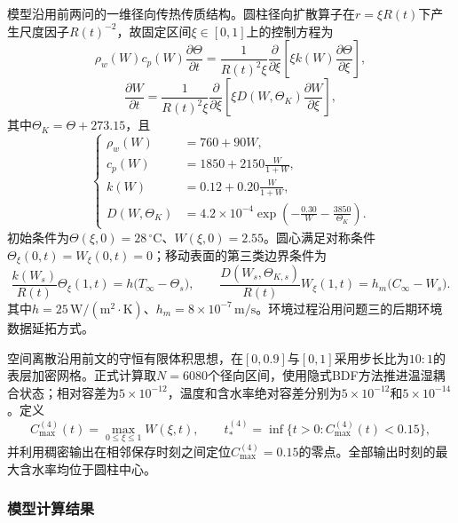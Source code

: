 \documentclass[withoutpreface,bwprint]{cumcmthesis}
\begin{document}
模型沿用前两问的一维径向传热传质结构。圆柱径向扩散算子在$r=\xi R(t)$下产生尺度因子$R(t)^{-2}$，故固定区间$\xi\in[0,1]$上的控制方程为
\begin{equation}
\boxed{
\rho_w(W)c_p(W)\frac{\partial\Theta}{\partial t}
=\frac{1}{R(t)^2\xi}
\frac{\partial}{\partial\xi}
\left[\xi k(W)\frac{\partial\Theta}{\partial\xi}\right],
}
\label{eq:q4-main-heat}
\end{equation}
\begin{equation}
\boxed{
\frac{\partial W}{\partial t}
=\frac{1}{R(t)^2\xi}
\frac{\partial}{\partial\xi}
\left[\xi D(W,\Theta_K)\frac{\partial W}{\partial\xi}\right],
}
\label{eq:q4-main-moisture}
\end{equation}
其中$\Theta_K=\Theta+273.15$，且
\begin{equation}
\left\{
\begin{aligned}
\rho_w(W)&=760+90W,\\
c_p(W)&=1850+2150\frac{W}{1+W},\\
k(W)&=0.12+0.20\frac{W}{1+W},\\
D(W,\Theta_K)&=4.2\times10^{-4}
\exp\!\left(-\frac{0.30}{W}-\frac{3850}{\Theta_K}\right).
\end{aligned}
\right.
\label{eq:q4-main-properties}
\end{equation}
初始条件为$\Theta(\xi,0)=28\,{}^\circ\mathrm C$、$W(\xi,0)=2.55$。圆心满足对称条件$\Theta_\xi(0,t)=W_\xi(0,t)=0$；移动表面的第三类边界条件为
\begin{equation}
\frac{k(W_s)}{R(t)}\Theta_\xi(1,t)
=h\bigl(T_\infty-\Theta_s\bigr),
\qquad
\frac{D(W_s,\Theta_{K,s})}{R(t)}W_\xi(1,t)
=h_m\bigl(C_\infty-W_s\bigr).
\label{eq:q4-main-boundary}
\end{equation}
其中$h=25\,\mathrm{W/(m^2\cdot K)}$、$h_m=8\times10^{-7}\,\mathrm{m/s}$。环境过程沿用问题三的后期环境数据延拓方式。

空间离散沿用前文的守恒有限体积思想，在$[0,0.9]$与$[0,1]$采用步长比为$10:1$的表层加密网格。正式计算取$N=6080$个径向区间，使用隐式BDF方法推进温湿耦合状态；相对容差为$5\times10^{-12}$，温度和含水率绝对容差分别为$5\times10^{-12}$和$5\times10^{-14}$。定义
\begin{equation}
C_{\max}^{(4)}(t)=\max_{0\le\xi\le1}W(\xi,t),
\qquad
t_*^{(4)}=\inf\{t>0:C_{\max}^{(4)}(t)<0.15\},
\label{eq:q4-main-event}
\end{equation}
并利用稠密输出在相邻保存时刻之间定位$C_{\max}^{(4)}=0.15$的零点。全部输出时刻的最大含水率均位于圆柱中心。

\subsubsection{模型计算结果}
\end{document}
